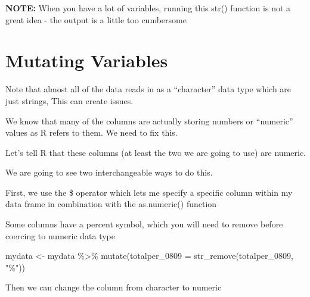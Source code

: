\documentclass[
]{book}
\newenvironment{Shaded}{\begin{snugshade}}{\end{snugshade}}
\newcommand{\AttributeTok}[1]{\textcolor[rgb]{0.77,0.63,0.00}{#1}}
\newcommand{\FunctionTok}[1]{\textcolor[rgb]{0.00,0.00,0.00}{#1}}
\newcommand{\NormalTok}[1]{#1}
\newcommand{\OtherTok}[1]{\textcolor[rgb]{0.56,0.35,0.01}{#1}}
\newcommand{\SpecialCharTok}[1]{\textcolor[rgb]{0.00,0.00,0.00}{#1}}
\newcommand{\StringTok}[1]{\textcolor[rgb]{0.31,0.60,0.02}{#1}}
\begin{document}
\textbf{NOTE:} When you have a lot of variables, running this str() function is not a great idea - the output is a little too cumbersome

\hypertarget{mutating-variables}{%
\section{Mutating Variables}\label{mutating-variables}}

Note that almost all of the data reads in as a ``character'' data type which are just strings,
This can create issues.

We know that many of the columns are actually storing numbers or ``numeric'' values as R refers to them.
We need to fix this.

Let's tell R that these columns (at least the two we are going to use) are numeric.

We are going to see two interchangeable ways to do this.

First, we use the \$ operator which lets me specify a specific column within my data frame in combination with the as.numeric() function

\begin{Shaded}
\end{Shaded}

Some columns have a percent symbol, which you will need to remove before coercing to numeric data type

\begin{Shaded}
\begin{Highlighting}[]
\NormalTok{mydata }\OtherTok{\textless{}{-}}\NormalTok{ mydata }\SpecialCharTok{\%\textgreater{}\%}
  \FunctionTok{mutate}\NormalTok{(}\AttributeTok{totalper\_0809 =} \FunctionTok{str\_remove}\NormalTok{(totalper\_0809, }\StringTok{"\%"}\NormalTok{))}
\end{Highlighting}
\end{Shaded}

Then we can change the column from character to numeric

\begin{Shaded}
\end{Shaded}
\end{document}
